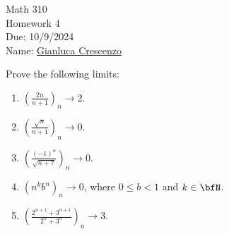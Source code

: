 \documentclass[10pt,twoside,openany]{memoir}
\begin{document}
\begin{center}
    { \Large Math 310 \\[0.1in]Homework 4 \\[0.1in]
    Due: 10/9/2024}\\[.25in]
    { Name:} {\underline{Gianluca Crescenzo\hspace*{2in}}}\\[0.15in]
    \end{center}
    \vspace{4pt}
    \begin{exercise}
        Prove the following limits:
            \begin{enumerate}[label = (\arabic*)]
                \item $\left(\frac{2n}{n+1}\right)_n \rightarrow 2$.
                \item $\left(\frac{\sqrt{n}}{n+1}\right)_n \rightarrow 0$.
                \item $\left(\frac{(-1)^n}{\sqrt{n+7}}\right)_n \rightarrow 0$.
                \item $(n^k b^n)_n \rightarrow 0$, where $0 \leq b < 1$ and $k \in \bfN$.
                \item $\left(\frac{2^{n+1}+3^{n+1}}{2^n + 3^n}\right)_n \rightarrow 3$.
            \end{enumerate}
    \end{exercise}
\end{document}

